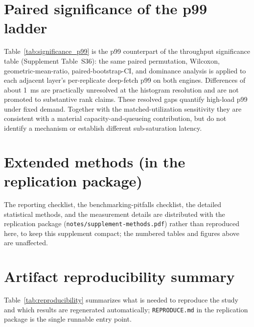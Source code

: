 \documentclass[11pt,a4paper]{article}
\newcommand{\tabledir}{tables/}
\begin{document}
\section{Paired significance of the p99 ladder}
\label{sup:significance-p99}
Table~\ref{tab:significance_p99} is the p99 counterpart of the throughput
significance table (Supplement Table~S36): the same paired permutation, Wilcoxon,
geometric-mean-ratio, paired-bootstrap-CI, and dominance analysis is applied to each
adjacent layer's per-replicate deep-fetch p99 on both engines. Differences of about
1~ms are practically unresolved at the histogram resolution and are not promoted to
substantive rank claims. These resolved gaps quantify high-load p99 under fixed demand.
Together with the matched-utilization sensitivity they are consistent with a material
capacity-and-queueing contribution, but do not identify a mechanism or establish
different sub-saturation latency.



\section{Extended methods (in the replication package)}
The reporting checklist, the benchmarking-pitfalls checklist, the detailed statistical methods, and
the measurement details are distributed with the replication package
(\texttt{notes/supplement-methods.pdf}) rather than reproduced here, to keep this supplement compact;
the numbered tables and figures above are unaffected.

\section{Artifact reproducibility summary}
\label{sup:reproducibility}
Table~\ref{tab:reproducibility} summarizes what is needed to reproduce the study and which
results are regenerated automatically; \texttt{REPRODUCE.md} in the replication package is
the single runnable entry point.
\end{document}
